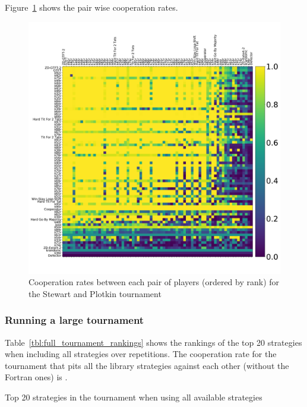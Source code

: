 \documentclass{article}
\begin{document}
Figure~\ref{fig:sp_tournament_cooperation_rates} shows the pair wise
cooperation rates.

\begin{figure}[!hbtp]
    \centering
    \includegraphics[width=.8\textwidth]{assets/sp_tournament_cooperation_rates}
    \caption{Cooperation rates between each pair of players (ordered by rank)
    for the Stewart and Plotkin tournament}
    \label{fig:sp_tournament_cooperation_rates}
\end{figure}

\subsubsection{Running a large tournament}\label{sec:run_with_everyone}

Table~\ref{tbl:full_tournament_rankings}
shows the rankings of the top 20 strategies when including all strategies over
repetitions.
The cooperation rate for the tournament that pits all the library strategies
against each other (without the Fortran ones) is
\unskip.

\begin{table}[!hbtp]
        \centering
        \footnotesize
        
        \caption{Top 20 strategies in the tournament when using all available
        strategies}
        \label{tbl:full_tournament_rankings}
\end{table}
\end{document}
